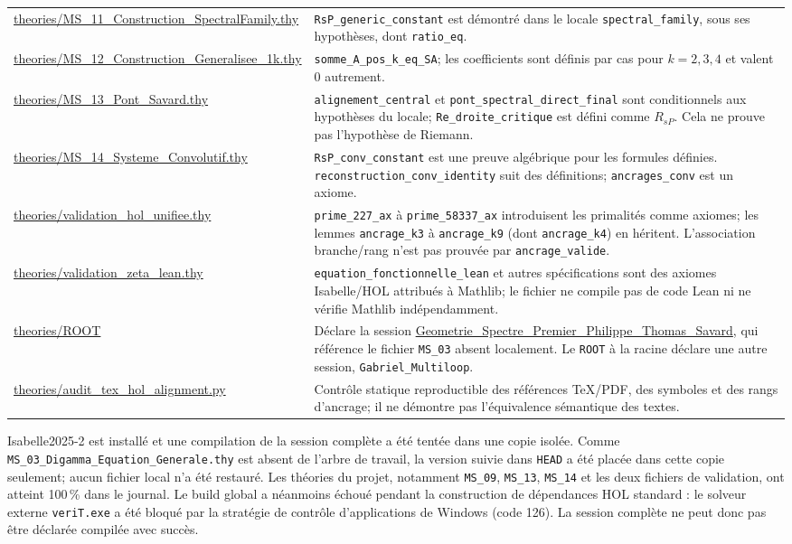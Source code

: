 \documentclass[11pt,a4paper]{article}
\begin{document}
\begin{longtable}{@{}p{} p{}@{}}
\url{theories/MS\_11\_Construction\_SpectralFamily.thy} & \texttt{RsP\_generic\_constant} est démontré dans le locale \texttt{spectral\_family}, sous ses hypothèses, dont \texttt{ratio\_eq}. \\
\url{theories/MS\_12\_Construction\_Generalisee\_1k.thy} & \texttt{somme\_A\_pos\_k\_eq\_SA}; les coefficients sont définis par cas pour $k=2,3,4$ et valent $0$ autrement. \\
\url{theories/MS\_13\_Pont\_Savard.thy} & \texttt{alignement\_central} et \texttt{pont\_spectral\_direct\_final} sont conditionnels aux hypothèses du locale; \texttt{Re\_droite\_critique} est défini comme $R_{sP}$. Cela ne prouve pas l'hypothèse de Riemann. \\
\url{theories/MS\_14\_Systeme\_Convolutif.thy} & \texttt{RsP\_conv\_constant} est une preuve algébrique pour les formules définies. \texttt{reconstruction\_conv\_identity} suit des définitions; \texttt{ancrages\_conv} est un axiome. \\
\url{theories/validation\_hol\_unifiee.thy} & \texttt{prime\_227\_ax} à \texttt{prime\_58337\_ax} introduisent les primalités comme axiomes; les lemmes \texttt{ancrage\_k3} à \texttt{ancrage\_k9} (dont \texttt{ancrage\_k4}) en héritent. L'association branche/rang n'est pas prouvée par \texttt{ancrage\_valide}. \\
\url{theories/validation\_zeta\_lean.thy} & \texttt{equation\_fonctionnelle\_lean} et autres spécifications sont des axiomes Isabelle/HOL attribués à Mathlib; le fichier ne compile pas de code Lean ni ne vérifie Mathlib indépendamment. \\
\url{theories/ROOT} & Déclare la session \url{Geometrie\_Spectre\_Premier\_Philippe\_Thomas\_Savard}, qui référence le fichier \texttt{MS\_03} absent localement. Le \texttt{ROOT} à la racine déclare une autre session, \texttt{Gabriel\_Multiloop}. \\
\url{theories/audit\_tex\_hol\_alignment.py} & Contrôle statique reproductible des références TeX/PDF, des symboles et des rangs d'ancrage; il ne démontre pas l'équivalence sémantique des textes. \\
\bottomrule
\end{longtable}
\normalsize

Isabelle2025-2 est installé et une compilation de la session complète a été
tentée dans une copie isolée. Comme \texttt{MS\_03\_Digamma\_Equation\_Generale.thy}
est absent de l'arbre de travail, la version suivie dans \texttt{HEAD} a été
placée dans cette copie seulement; aucun fichier local n'a été restauré.
Les théories du projet, notamment \texttt{MS\_09}, \texttt{MS\_13},
\texttt{MS\_14} et les deux fichiers de validation, ont atteint 100\,\% dans
le journal. Le build global a néanmoins échoué pendant la construction de
dépendances HOL standard : le solveur externe \texttt{veriT.exe} a été bloqué
par la stratégie de contrôle d'applications de Windows (code 126). La session
complète ne peut donc pas être déclarée compilée avec succès.
\end{document}
